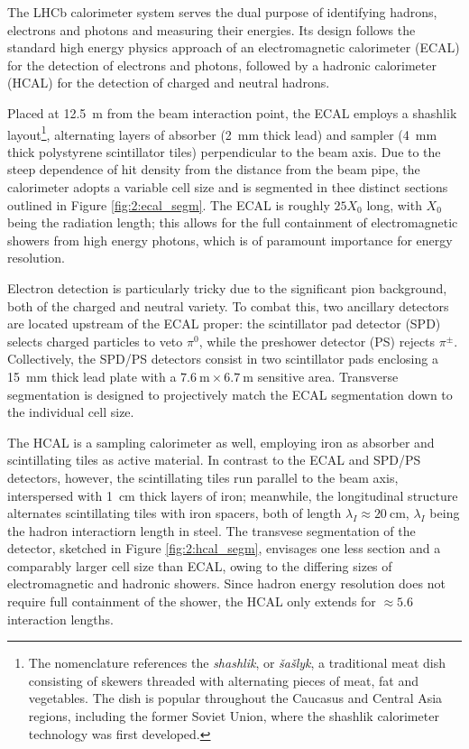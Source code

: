 The LHCb calorimeter system \cite{Amato:494264} serves the dual purpose of identifying hadrons, electrons and photons and measuring their energies.
Its design follows the standard high energy physics approach of an electromagnetic calorimeter (ECAL) for the detection of electrons and photons, followed by a hadronic calorimeter (HCAL) for the detection of charged and neutral hadrons.

Placed at \SI{12.5}{\meter} from the beam interaction point, the ECAL employs a shashlik layout\footnote{The nomenclature references the \textit{shashlik}, or \textit{šašlyk}, a traditional meat dish consisting of skewers threaded with alternating pieces of meat, fat and vegetables. The dish is popular throughout the Caucasus and Central Asia regions, including the former Soviet Union, where the shashlik calorimeter technology was first developed.}, alternating layers of absorber (\SI{2}{\milli\meter} thick lead) and sampler (\SI{4}{\milli\meter} thick polystyrene scintillator tiles) perpendicular to the beam axis.
Due to the steep dependence of hit density from the distance from the beam pipe, the calorimeter adopts a variable cell size and is segmented in thee distinct sections outlined in Figure \ref{fig:2:ecal_segm}.
The ECAL is roughly $25X_0$ long, with $X_0$ being the radiation length; this allows for the full containment of electromagnetic showers from high energy photons, which is of paramount importance for energy resolution.

Electron detection is particularly tricky due to the significant pion background, both of the charged and neutral variety.
To combat this, two ancillary detectors are located upstream of the ECAL proper: the scintillator pad detector (SPD) selects charged particles to veto $\pi^0$, while the preshower detector (PS) rejects $\pi^\pm$.
Collectively, the SPD/PS detectors consist in two scintillator pads enclosing a \SI{15}{\milli\meter} thick lead plate with a $\SI{7.6}{\meter} \times \SI{6.7}{\meter}$ sensitive area.
Transverse segmentation is designed to projectively match the ECAL segmentation down to the individual cell size.

The HCAL is a sampling calorimeter as well, employing iron as absorber and scintillating tiles as active material.
In contrast to the ECAL and SPD/PS detectors, however, the scintillating tiles run parallel to the beam axis, interspersed with \SI{1}{\centi\meter} thick layers of iron;
meanwhile, the longitudinal structure alternates scintillating tiles with iron spacers, both of length $\lambda_I \approx \SI{20}{\centi\meter}$, $\lambda_I$ being the hadron interactiorn length in steel.
The transvese segmentation of the detector, sketched in Figure \ref{fig:2:hcal_segm}, envisages one less section and a comparably larger cell size than ECAL, owing to the differing sizes of electromagnetic and hadronic showers.
Since hadron energy resolution does not require full containment of the shower, the HCAL only extends for $\approx 5.6$ interaction lengths.

